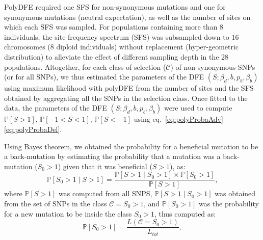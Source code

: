 \documentclass{article}
\newcommand{\proba}{\mathbb{P}}
\newcommand{\Sphy}{S_{0}}
\newcommand{\Sphyclass}{\mathcal{C}}
\newcommand{\divAdv}{ \Sphy > 1}
\newcommand{\given}{\mid}
\newcommand{\Spop}{S}
\newcommand{\polyDel}{\Spop < -1}
\newcommand{\polyNeutral}{-1 < \Spop < 1}
\newcommand{\polyAdv}{ \Spop > 1}
\newcommand{\PpolyDel}{\proba \left[ \polyDel \right]}
\newcommand{\PpolyNeutral}{\proba \left[ \polyNeutral \right]}
\newcommand{\PpolyAdv}{\proba \left[ \polyAdv \right]}
\newcommand{\AdvMean}{\beta_b}
\newcommand{\DelMean}{\beta_d}
\begin{document}
    PolyDFE required one SFS for non-synonymous mutations and one for synonymous mutations (neutral expectation), as well as the number of sites on which each SFS was sampled.
    For populations containing more than $8$ individuals, the site-frequency spectrum (SFS) was subsampled down to $16$ chromosomes ($8$ diploid individuals) without replacement (hyper-geometric distribution) to alleviate the effect of different sampling depth in the 28 populations.
    Altogether, for each class of selection ($\Sphyclass$) of non-synonymous SNPs (or for all SNPs), we thus estimated the parameters of the DFE $\left( \Spop; \DelMean , b, p_b, \AdvMean \right)$ using maximum likelihood with polyDFE from the number of sites and the SFS obtained by aggregating all the SNPs in the selection class.
    Once fitted to the data, the parameters of the DFE $\left( \Spop; \DelMean , b, p_b, \AdvMean \right)$ were used to compute $\PpolyAdv$, $\PpolyNeutral$, $\PpolyDel$ using eq.~\ref{eq:polyProbaAdv}-\ref{eq:polyProbaDel}.

    Using Bayes theorem, we obtained the probability for a beneficial mutation to be a back-mutation by estimating the probability that a mutation was a back-mutation ($\divAdv$) given that it was beneficial ($\polyAdv$), as:
    \begin{equation}
        \proba \left[\divAdv \given \polyAdv\right] = \frac{\proba \left[\polyAdv \given \divAdv\right] \times \proba\left[\divAdv\right]}{\PpolyAdv},
        \label{eq:bayes}
    \end{equation}
    where $\PpolyAdv$ was computed from all SNPS, $\proba \left[\polyAdv \given \divAdv\right]$ was obtained from the set of SNPs in the class $\Sphyclass = \divAdv$, and $\proba\left[\divAdv\right]$ was the probability for a new mutation to be inside the class $\divAdv$, thus computed as:
    \begin{equation}
        \proba\left[\divAdv\right] = \frac{L\left( \Sphyclass = \divAdv \right)}{L_{tot}},
        \label{eq:proba-dfe-mutsel}
    \end{equation}

    \printbibliography
\end{document}
